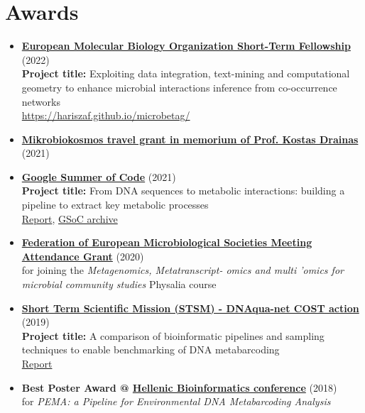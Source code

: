 
\section*{Awards}

\begin{itemize}

   \item{
      \textbf{\href{https://www.embo.org/funding/fellowships-grants-and-career-support/scientific-exchange-grants/}{European Molecular Biology Organization Short-Term Fellowship}} (2022) \\ 
      \textbf{Project title:} Exploiting data integration, text-mining and computational geometry to enhance microbial interactions inference from  co-occurrence networks \\
      \href{Report}{https://hariszaf.github.io/microbetag/}

   }

   \item{
      \textbf{\href{https://www.mikrobiokosmos2021.org/}{Mikrobiokosmos travel grant in memorium of Prof. Kostas Drainas}} (2021) 
   }

   \item{
      \textbf{\href{https://summerofcode.withgoogle.com/}{Google Summer of Code}} (2021) \\
      \textbf{Project title:} From DNA sequences to metabolic interactions: building a pipeline to extract key metabolic processes \\
      \href{https://summerofcode.withgoogle.com/archive/2021/projects/6407348884602880}{Report}, \href{https://hariszaf.github.io/gsoc2021/}{GSoC archive}
   }

   \item{
      \textbf{\href{https://fems-microbiology.org/}{Federation of European Microbiological Societies Meeting Attendance Grant}} (2020) \\ 
      for joining the \textit{Metagenomics, Metatranscript- omics and multi 'omics for microbial community studies} Physalia course

   }

   \item{
      \textbf{\href{https://dnaqua.net/stsms/}{Short Term Scientific Mission (STSM) - DNAqua-net COST action}} (2019) \\
      \textbf{Project title:} 
      A comparison of bioinformatic pipelines and sampling techniques to enable benchmarking of DNA metabarcoding \\
      \href{http://dnaqua.net/wp-content/uploads/2019/08/Zafeiropoulos.pdf}{Report}
   }

   \item{
      \textbf{Best Poster Award @ \href{https://hscbio.wordpress.com/}{Hellenic Bioinformatics conference}} (2018) \\
      for \textit{PEMA: a Pipeline for Environmental DNA Metabarcoding Analysis}
   }

\end{itemize}






